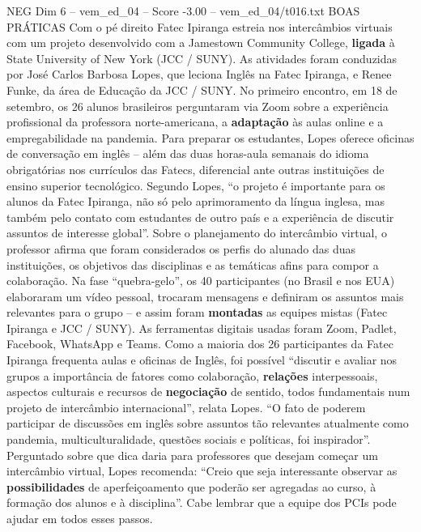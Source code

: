 \begin{textsample}{NEG Dim 6 – vem\_ed\_04 – Score -3.00 – vem\_ed\_04/t016.txt}  \label{ex:f6_neg_023}
BOAS PRÁTICAS Com o pé direito Fatec Ipiranga estreia nos intercâmbios virtuais com um projeto desenvolvido com a Jamestown Community College, \textbf{ligada} à State University of New York (JCC / SUNY).
As atividades foram conduzidas por José Carlos Barbosa Lopes, que leciona Inglês na Fatec Ipiranga, e Renee Funke, da área de Educação da JCC / SUNY.
No primeiro encontro, em 18 de setembro, os 26 alunos brasileiros perguntaram via Zoom sobre a experiência profissional da professora norte-americana, a \textbf{adaptação} às aulas online e a empregabilidade na pandemia.
Para preparar os estudantes, Lopes oferece oficinas de conversação em inglês – além das duas horas-aula semanais do idioma obrigatórias nos currículos das Fatecs, diferencial ante outras instituições de ensino superior tecnológico.
Segundo Lopes, “o projeto é importante para os alunos da Fatec Ipiranga, não só pelo aprimoramento da língua inglesa, mas também pelo contato com estudantes de outro país e a experiência de discutir assuntos de interesse global”.
Sobre o planejamento do intercâmbio virtual, o professor afirma que foram considerados os perfis do alunado das duas instituições, os objetivos das disciplinas e as temáticas afins para compor a colaboração.
Na fase “quebra-gelo”, os 40 participantes (no Brasil e nos EUA) elaboraram um vídeo pessoal, trocaram mensagens e definiram os assuntos mais relevantes para o grupo – e assim foram \textbf{montadas} as equipes mistas (Fatec Ipiranga e JCC / SUNY).
As ferramentas digitais usadas foram Zoom, Padlet, Facebook, WhatsApp e Teams.
Como a maioria dos 26 participantes da Fatec Ipiranga frequenta aulas e oficinas de Inglês, foi possível “discutir e avaliar nos grupos a importância de fatores como colaboração, \textbf{relações} interpessoais, aspectos culturais e recursos de \textbf{negociação} de sentido, todos fundamentais num projeto de intercâmbio internacional”, relata Lopes. “O fato de poderem participar de discussões em inglês sobre assuntos tão relevantes atualmente como pandemia, multiculturalidade, questões sociais e políticas, foi inspirador”.
Perguntado sobre que dica daria para professores que desejam começar um intercâmbio virtual, Lopes recomenda: “Creio que seja interessante observar as \textbf{possibilidades} de aperfeiçoamento que poderão ser agregadas ao curso, à formação dos alunos e à disciplina”.
Cabe lembrar que a equipe dos PCIs pode ajudar em todos esses passos.

\end{textsample}
